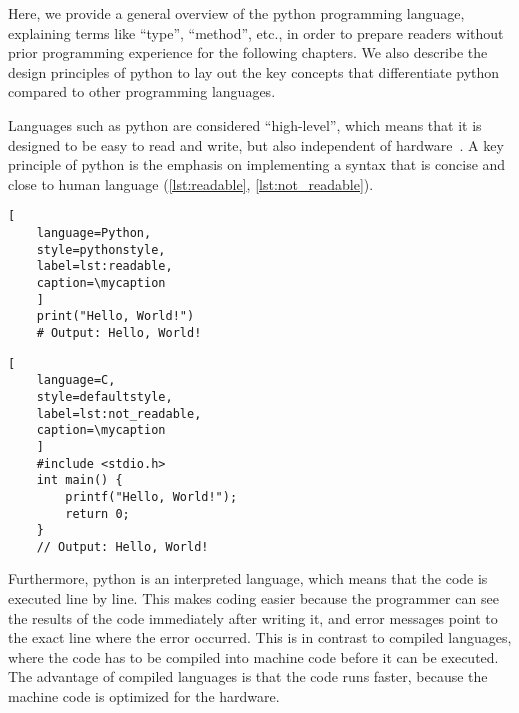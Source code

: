 Here, we provide a general overview of the python programming language,
explaining terms like ``type'', ``method'', etc., in order to prepare readers
without prior programming experience for the following chapters. We also
describe the design principles of python to lay out the key concepts that
differentiate python compared to other programming languages.

Languages such as python are considered ``high-level'', which means that it is
designed to be easy to read and write, but also independent of
hardware~\cite{PythonLanguageReference}. A key principle of python is the
emphasis on implementing a syntax that is concise and close to human language
(\autoref{lst:readable}, \autoref{lst:not_readable}).

\def\mycaption{ Example of readable python code. This one-line code
    returns the words (string) \texttt{"Hello, World!"} when executed. The command
    is straightforward and easy to understand.}
\begin{lstlisting}[
    language=Python, 
    style=pythonstyle,
    label=lst:readable,
    caption=\mycaption
    ]
    print("Hello, World!")
    # Output: Hello, World!
\end{lstlisting}

\def\mycaption{ Example of less readable code written in the low-level
    programming language C. This code is doing exactly the same as the python
    code in \autoref{lst:readable}. The command is harder to understand because
    more steps are needed to access the same functionality, including the
    definition of a function}
\begin{lstlisting}[
    language=C, 
    style=defaultstyle,
    label=lst:not_readable, 
    caption=\mycaption
    ]
    #include <stdio.h>
    int main() {
        printf("Hello, World!");
        return 0;
    }
    // Output: Hello, World!
\end{lstlisting}

Furthermore, python is an interpreted language, which means that the code is
executed line by line. This makes coding easier because the programmer can see
the results of the code immediately after writing it, and error messages point
to the exact line where the error occurred. This is in contrast to compiled
languages, where the code has to be compiled into machine code before it can be
executed. The advantage of compiled languages is that the code runs faster,
because the machine code is optimized for the hardware.

